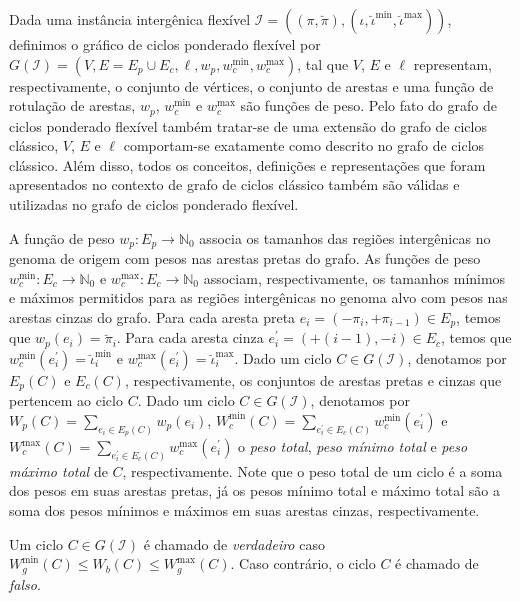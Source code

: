 Dada uma instância intergênica flexível $\mathcal{I} = ((\pi,\breve\pi),(\iota,\breve\iota^{\min},\breve\iota^{\max}))$, definimos o gráfico de ciclos ponderado flexível por $G(\mathcal{I}) = (V, E=E_p \cup E_c, \ell, w_p, w^{\min}_c, w^{\max}_c)$, tal que $V$, $E$ e $\ell$ representam, respectivamente, o conjunto de vértices, o conjunto de arestas e uma função de rotulação de arestas, $w_p$, $w^{\min}_c$ e $w^{\max}_c$ são funções de peso. Pelo fato do grafo de ciclos ponderado flexível também tratar-se de uma extensão do grafo de ciclos clássico, $V$, $E$ e $\ell$ comportam-se exatamente como descrito no grafo de ciclos clássico. Além disso, todos os conceitos, definições e representações que foram apresentados no contexto de grafo de ciclos clássico também são válidas e utilizadas no grafo de ciclos ponderado flexível.

A função de peso $w_p : E_p \rightarrow \mathbb{N}_0$ associa os tamanhos das regiões intergênicas no genoma de origem com pesos nas arestas pretas do grafo. As funções de peso $w^{\min}_c : E_c \rightarrow \mathbb{N}_0$ e $w^{\max}_c : E_c \rightarrow \mathbb{N}_0$ associam, respectivamente, os tamanhos mínimos e máximos permitidos para as regiões intergênicas no genoma alvo com pesos nas arestas cinzas do grafo. Para cada aresta preta $e_i = (-\pi_i, +\pi_{i-1}) \in E_p$, temos que $w_p(e_i) = \breve\pi_i$. Para cada aresta cinza $e^{\prime}_i = (+(i-1), -i) \in E_c$, temos que $w^{\min}_c(e^{\prime}_i) = \breve\iota^{\min}_i$ e $w^{\max}_c(e^{\prime}_i) = \breve\iota^{\max}_i$. Dado um ciclo $C \in G(\mathcal{I})$, denotamos por $E_p(C)$ e $E_c(C)$, respectivamente, os conjuntos de arestas pretas e cinzas que pertencem ao ciclo $C$. Dado um ciclo $C \in G(\mathcal{I})$, denotamos por $W_p(C)=\sum_{e_i \in E_p(C)} w_p(e_i)$, $W^{\min}_c(C)=\sum_{e^{\prime}_i \in E_c(C)} w^{\min}_c(e^{\prime}_i)$ e $W^{\max}_c(C)=\sum_{e^{\prime}_i \in E_c(C)} w^{\max}_c(e^{\prime}_i)$ o \emph{peso total}, \emph{peso mínimo total} e \emph{peso máximo total} de $C$, respectivamente. Note que o peso total de um ciclo é a soma dos pesos em suas arestas pretas, já os pesos mínimo total e máximo total são a soma dos pesos mínimos e máximos em suas arestas cinzas, respectivamente.

\begin{definition}
Um ciclo $C \in G(\mathcal{I})$ é chamado de \emph{verdadeiro} caso $W^{\min}_g(C) \le W_b(C) \le W^{\max}_g(C)$. Caso contrário, o ciclo $C$ é chamado de \emph{falso}.
\end{definition}

